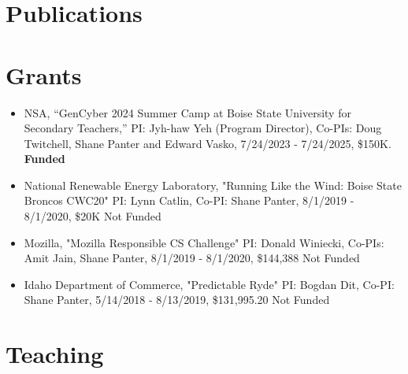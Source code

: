 \documentclass{shanep}
\begin{document}
\section*{Publications}

\printbibliography[heading=none]

\section*{Grants}

\begin{itemize}
  \item{NSA, “GenCyber 2024 Summer Camp at Boise State University for Secondary Teachers,” PI:
    Jyh-haw Yeh (Program Director), Co-PIs: Doug Twitchell, Shane Panter and Edward Vasko, 7/24/2023
    - 7/24/2025, \$150K. \textbf{Funded}}
  \item{National Renewable Energy Laboratory, "Running Like the Wind: Boise State Broncos CWC20" PI:
    Lynn Catlin, Co-PI: Shane Panter, 8/1/2019 - 8/1/2020, \$20K Not Funded}
  \item{Mozilla, "Mozilla Responsible CS Challenge" PI: Donald Winiecki, Co-PIs: Amit Jain, Shane
    Panter, 8/1/2019 - 8/1/2020, \$144,388 Not Funded}
  \item{Idaho Department of Commerce, "Predictable Ryde" PI: Bogdan Dit, Co-PI: Shane Panter,
    5/14/2018 - 8/13/2019, \$131,995.20 Not Funded}
\end{itemize}

\section*{Teaching}
\end{document}
